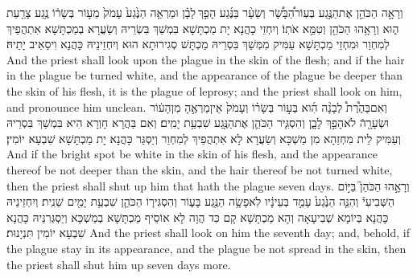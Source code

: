 {וְרָאָ֣ה הַכֹּהֵ֣ן אֶת\maqqaf הַנֶּ֣גַע בְּעֽוֹר\maqqaf הַ֠בָּשָׂ֠ר וְשֵׂעָ֨ר בַּנֶּ֜גַע הָפַ֣ךְ \legarmeh  לָבָ֗ן וּמַרְאֵ֤ה הַנֶּ֙גַע֙ עָמֹק֙ מֵע֣וֹר בְּשָׂר֔וֹ נֶ֥גַע צָרַ֖עַת ה֑וּא וְרָאָ֥הוּ הַכֹּהֵ֖ן וְטִמֵּ֥א אֹתֽוֹ׃}
{וְיִחְזֵי כָהֲנָא יָת מַכְתָּשָׁא בִּמְשַׁךְ בִּשְׂרֵיהּ וְשַׂעֲרָא בְמַכְתָּשָׁא אִתְהֲפֵיךְ לְמִחְוַר וּמִחְזֵי מַכְתָּשָׁא עַמִּיק מִמְּשַׁךְ בִּסְרֵיהּ מַכְתָּשׁ סְגִירוּתָא הוּא וְיִחְזֵינֵיהּ כָּהֲנָא וִיסַאֵיב יָתֵיהּ׃}
{And the priest shall look upon the plague in the skin of the flesh; and if the hair in the plague be turned white, and the appearance of the plague be deeper than the skin of his flesh, it is the plague of leprosy; and the priest shall look on him, and pronounce him unclean.}{}
{וְאִם\maqqaf בַּהֶ֩רֶת֩ לְבָנָ֨ה הִ֜וא בְּע֣וֹר בְּשָׂר֗וֹ וְעָמֹק֙ אֵין\maqqaf מַרְאֶ֣הָ מִן\maqqaf הָע֔וֹר וּשְׂעָרָ֖הֿ לֹא\maqqaf הָפַ֣ךְ לָבָ֑ן וְהִסְגִּ֧יר הַכֹּהֵ֛ן אֶת\maqqaf הַנֶּ֖גַע שִׁבְעַ֥ת יָמִֽים׃}
{וְאִם בַּהֲרָא חָוְרָא הִיא בִּמְשַׁךְ בִּסְרֵיהּ וְעַמִּיק לֵית מִחְזַהָא מִן מַשְׁכָּא וְשַׂעֲרָא לָא אִתְהֲפֵיךְ לְמִחְוַר וְיַסְגַּר כָּהֲנָא יָת מַכְתָּשָׁא שִׁבְעָא יוֹמִין׃}
{And if the bright spot be white in the skin of his flesh, and the appearance thereof be not deeper than the skin, and the hair thereof be not turned white, then the priest shall shut up him that hath the plague seven days.}{}
{וְרָאָ֣הוּ הַכֹּהֵן֮ בַּיּ֣וֹם הַשְּׁבִיעִי֒ וְהִנֵּ֤ה הַנֶּ֙גַע֙ עָמַ֣ד בְּעֵינָ֔יו לֹֽא\maqqaf פָשָׂ֥ה הַנֶּ֖גַע בָּע֑וֹר וְהִסְגִּיר֧וֹ הַכֹּהֵ֛ן שִׁבְעַ֥ת יָמִ֖ים שֵׁנִֽית׃}
{וְיִחְזֵינֵיהּ כָּהֲנָא בְּיוֹמָא שְׁבִיעָאָה וְהָא מַכְתָּשָׁא קָם כִּד הֲוָה לָא אוֹסֵיף מַכְתָּשָׁא בְמַשְׁכָּא וְיַסְגְּרִנֵּיהּ כָּהֲנָא שִׁבְעָא יוֹמִין תִּנְיָנוּת׃}
{And the priest shall look on him the seventh day; and, behold, if the plague stay in its appearance, and the plague be not spread in the skin, then the priest shall shut him up seven days more.}{}
